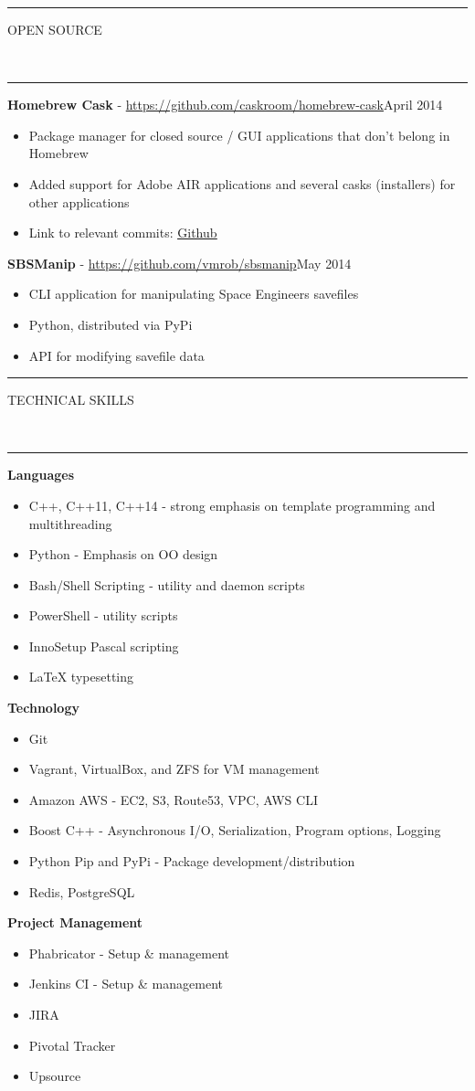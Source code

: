 \documentclass[10pt, letterpaper, oneside]{article}
\newcommand{\HRule}[2]{\textcolor{#1}{\rule{\linewidth}{#2}}}
\newcommand{\sectiontitle}[1]{\begin{minipage}{\textwidth}\HRule{black}{0.25mm}\vspace{-10pt}\begin{center}\Large\MakeUppercase{#1}\end{center}\end{minipage}\\\HRule{light-grey}{0.15mm}\vspace{\baselineskip}}
\newenvironment{tightressection}[1]{
  \begin{minipage}{\textwidth}
  \sectiontitle{#1}}
  {\vspace{2\baselineskip}\end{minipage}}
\newcommand{\resitem}[1]{
    \vspace{2pt}
    \item \begin{flushleft} #1 \end{flushleft}
}
\newcommand{\resentryheader}[3]{
    \vspace{-5pt}
    \textbf{#1} - #2\hspace{\stretch{1}}\textcolor{light-grey}{#3}\\
}
\newenvironment{resentry}[3]{
  \begin{minipage}{\textwidth}
    \resentryheader{#1}{#2}{#3}
        \vspace{-\baselineskip}
    \begin{itemize}[noitemsep,nolistsep]
}{
    \end{itemize}
        \vspace{\baselineskip}
        \end{minipage}
}
\newcommand{\restechentryheader}[1]{
    \vspace{-5pt}
    \textbf{#1}\\
}
\newenvironment{restechentry}[1]{
  \begin{minipage}{\textwidth}
    \restechentryheader{#1}
        \vspace{-\baselineskip}
    \begin{itemize}[noitemsep,nolistsep]
}{
    \end{itemize}
        \vspace{\baselineskip}
        \end{minipage}
}
\begin{document}
\begin{tightressection}{Open Source}
  \begin{resentry}{Homebrew Cask}{\href{https://github.com/caskroom/homebrew-cask}{https://github.com/caskroom/homebrew-cask}}{April 2014}
    \resitem{Package manager for closed source / GUI applications that don't belong in Homebrew}
    \resitem{Added support for Adobe AIR applications and several casks (installers) for other applications}
    \resitem{Link to relevant commits: \href{https://github.com/caskroom/homebrew-cask/commits?author=vmrob}{\ul{Github}}}
  \end{resentry}

  \begin{resentry}{SBSManip}{\href{https://github.com/vmrob/sbsmanip}{https://github.com/vmrob/sbsmanip}}{May 2014}
    \resitem{CLI application for manipulating Space Engineers savefiles}
    \resitem{Python, distributed via PyPi}
    \resitem{API for modifying savefile data}
  \end{resentry}

\end{tightressection}

\begin{tightressection}{Technical Skills}
  \begin{restechentry}{Languages}
    \resitem{C++, C++11, C++14 - strong emphasis on template programming and multithreading}
    \resitem{Python - Emphasis on OO design}
    \resitem{Bash/Shell Scripting - utility and daemon scripts}
    \resitem{PowerShell - utility scripts}
    \resitem{InnoSetup Pascal scripting}
    \resitem{LaTeX typesetting}
  \end{restechentry}
  \begin{restechentry}{Technology}
    \resitem{Git}
    \resitem{Vagrant, VirtualBox, and ZFS for VM management}
    \resitem{Amazon AWS - EC2, S3, Route53, VPC, AWS CLI}
    \resitem{Boost C++ - Asynchronous I/O, Serialization, Program options, Logging}
    \resitem{Python Pip and PyPi - Package development/distribution}
    \resitem{Redis, PostgreSQL}
  \end{restechentry}
  \begin{restechentry}{Project Management}
    \resitem{Phabricator - Setup \& management}
    \resitem{Jenkins CI - Setup \& management}
    \resitem{JIRA}
    \resitem{Pivotal Tracker}
    \resitem{Upsource}
  \end{restechentry}
\end{tightressection}
\end{document}
